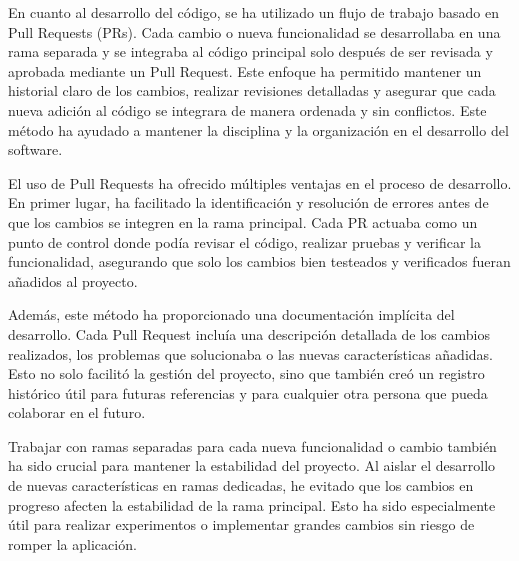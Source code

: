En cuanto al desarrollo del código, se ha utilizado un flujo de trabajo basado en Pull Requests (PRs). Cada cambio o nueva 
funcionalidad se desarrollaba en una rama separada y se integraba al código principal solo después de ser revisada y aprobada 
mediante un Pull Request. Este enfoque ha permitido mantener un historial claro de los cambios, realizar revisiones detalladas y 
asegurar que cada nueva adición al código se integrara de manera ordenada y sin conflictos. Este método ha ayudado a mantener la disciplina y la organización en el
 desarrollo del software.

El uso de Pull Requests ha ofrecido múltiples ventajas en el proceso de desarrollo. En primer lugar, ha facilitado la identificación y 
resolución de errores antes de que los cambios se integren en la rama principal. Cada PR actuaba como un punto de control donde podía revisar 
el código, realizar pruebas y verificar la funcionalidad, asegurando que solo los cambios bien testeados y verificados fueran añadidos al proyecto.

Además, este método ha proporcionado una documentación implícita del desarrollo. Cada Pull Request incluía una descripción detallada de los 
cambios realizados, los problemas que solucionaba o las nuevas características añadidas. Esto no solo facilitó la gestión del proyecto, sino 
que también creó un registro histórico útil para futuras referencias y para cualquier otra persona que pueda colaborar en el futuro.

Trabajar con ramas separadas para cada nueva funcionalidad o cambio también ha sido crucial para mantener la estabilidad del proyecto. Al aislar el 
desarrollo de nuevas características en ramas dedicadas, he evitado que los cambios en progreso afecten la estabilidad de la rama principal. Esto ha 
sido especialmente útil para realizar experimentos o implementar grandes cambios sin riesgo de romper la aplicación.

